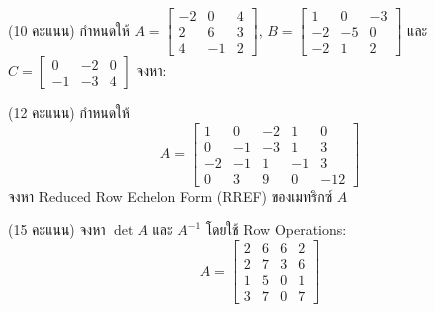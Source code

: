 ﻿\documentclass[12pt, a4paper]{exam}
\begin{document}
\begin{questions}

\question (10 คะแนน) กำหนดให้ $A = \begin{bmatrix} -2 & 0 & 4 \\ 2 & 6 & 3 \\ 4 & -1 & 2 \end{bmatrix}$, $B = \begin{bmatrix} 1 & 0 & -3 \\ -2 & -5 & 0 \\ -2 & 1 & 2 \end{bmatrix}$ และ $C = \begin{bmatrix} 0 & -2 & 0 \\ -1 & -3 & 4 \end{bmatrix}$ จงหา:
\vspace{5cm}

\question (12 คะแนน) กำหนดให้
\[
A = \begin{bmatrix} 1 & 0 & -2 & 1 & 0 \\ 0 & -1 & -3 & 1 & 3 \\ -2 & -1 & 1 & -1 & 3 \\ 0 & 3 & 9 & 0 & -12 \end{bmatrix}
\]
จงหา Reduced Row Echelon Form (RREF) ของเมทริกซ์ $A$
\vspace{5cm}

\question (15 คะแนน) จงหา $\det A$ และ $A^{-1}$ โดยใช้ Row Operations:
\[
A = \begin{bmatrix} 2 & 6 & 6 & 2 \\ 2 & 7 & 3 & 6 \\ 1 & 5 & 0 & 1 \\ 3 & 7 & 0 & 7 \end{bmatrix}
\]
\vspace{5cm}


\end{questions}
\end{document}
